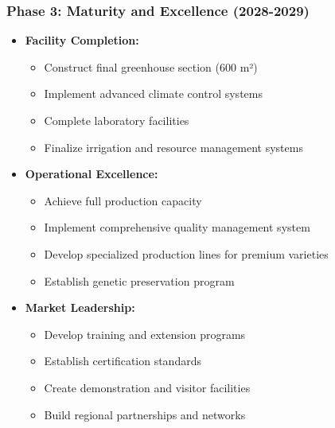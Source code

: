 \subsubsection{Phase 3: Maturity and Excellence (2028-2029)}
\begin{itemize}
    \item \textbf{Facility Completion:}
    \begin{itemize}
        \item Construct final greenhouse section (600 m²)
        \item Implement advanced climate control systems
        \item Complete laboratory facilities
        \item Finalize irrigation and resource management systems
    \end{itemize}
    
    \item \textbf{Operational Excellence:}
    \begin{itemize}
        \item Achieve full production capacity
        \item Implement comprehensive quality management system
        \item Develop specialized production lines for premium varieties
        \item Establish genetic preservation program
    \end{itemize}
    
    \item \textbf{Market Leadership:}
    \begin{itemize}
        \item Develop training and extension programs
        \item Establish certification standards
        \item Create demonstration and visitor facilities
        \item Build regional partnerships and networks
    \end{itemize}
\end{itemize}

